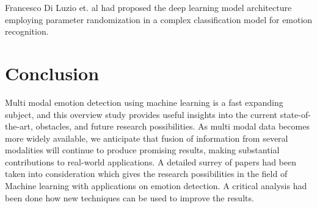 \documentclass[conference]{IEEEtran}
\begin{document}
Francesco Di Luzio et. al \cite{di2023randomized} had proposed the deep learning model  architecture employing parameter randomization in a complex classification model for emotion recognition. 

\section{Conclusion}

Multi modal emotion detection using machine learning is a fast expanding subject, and this overview study provides useful insights into the current state-of-the-art, obstacles, and future research possibilities. As multi modal data becomes more widely available, we anticipate that fusion of information from several modalities will continue to produce promising results, making substantial contributions to real-world applications. A detailed surrey of papers had been taken into consideration which gives the research possibilities in the field of Machine learning with applications on emotion detection. A critical analysis had been done how new techniques can be used to improve the results. 



\end{document}
